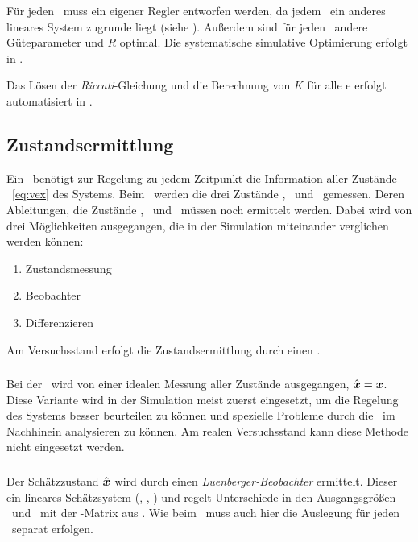 Für jeden \ap\ muss ein eigener Regler entworfen werden, da jedem \ap\ ein anderes lineares System zugrunde liegt (siehe ).
Außerdem sind für jeden \ap\ andere Güteparameter  und $R$ optimal. Die systematische simulative Optimierung erfolgt in .

Das Lösen der \emph{Riccati}-Gleichung und die Berechnung von $K$ für alle \ap e erfolgt automatisiert in \ml.


\subsection{Zustandsermittlung}

Ein \zsr\ benötigt zur Regelung zu jedem Zeitpunkt die Information aller Zustände \vex\ \eqref{eq:vex} des Systems. Beim \spds\ werden die drei Zustände \xo, \phe\ und \phz\ gemessen. Deren Ableitungen, die Zustände \xop, \phep\ und \phzp\ müssen noch ermittelt werden. Dabei wird von drei Möglichkeiten ausgegangen, die in der Simulation miteinander verglichen werden können:
\begin{enumerate}
	\item Zustandsmessung
	\item Beobachter
	\item Differenzieren 
\end{enumerate}
Am Versuchsstand erfolgt die Zustandsermittlung durch einen \beob.

\subsubsection{\zm}

Bei der \zm\ wird von einer idealen Messung aller Zustände ausgegangen, \dah $\hat{\boldsymbol{x}}=\boldsymbol{x}$. 
Diese Variante wird in der Simulation meist zuerst eingesetzt, um die Regelung des Systems besser beurteilen zu können und spezielle Probleme durch die \ze\ im Nachhinein analysieren zu können.
Am realen Versuchsstand kann diese Methode nicht eingesetzt werden.

\subsubsection{\beob}

Der Schätzzustand $\hat{\boldsymbol{x}}$ wird durch einen \emph{Luenberger-Beobachter} ermittelt. 
Dieser  ein lineares Schätzsystem (, , ) und regelt Unterschiede in den Ausgangsgrößen \vey\ und \veyd\ mit der \beob-Matrix  aus \cite{AdamyRT2}. 
Wie beim \zsr\ muss auch hier die Auslegung für jeden \ap\ separat erfolgen.

